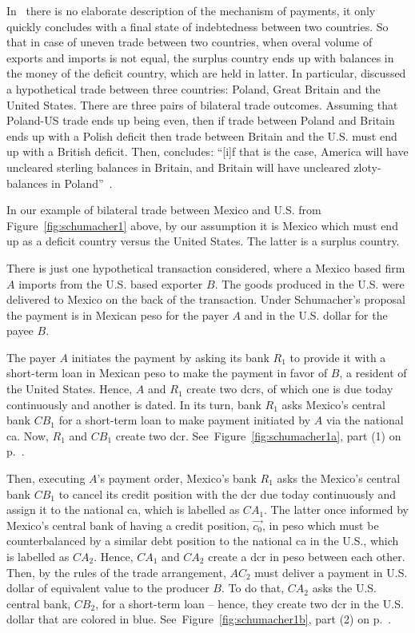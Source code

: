 In~\cite{schumacher1943} there is no elaborate description of the mechanism of payments, it only quickly concludes with a final state of indebtedness between two countries. So that in case of uneven trade between two countries, when overal volume of exports and imports is not equal, the surplus country ends up with balances in the money of the deficit country, which are held in latter. In particular, \citeauthor{schumacher1943} discussed a hypothetical trade between three countries: Poland, Great Britain and the United States. There are three pairs of bilateral trade outcomes. Assuming that Poland-US trade ends up being even, then if trade between Poland and Britain ends up with a Polish deficit then trade between Britain and the U.S. must end up with a British deficit. Then, \citeauthor{schumacher1943} concludes: ``[i]f that is the case, America will have uncleared sterling balances in Britain, and Britain will have uncleared zloty-balances in Poland''~\citep[pp.150-151]{schumacher1943}.

In our example of bilateral trade between Mexico and U.S. from Figure~\ref{fig:schumacher1} above, by our assumption it is Mexico which must end up as a deficit country versus the United States. The latter is a surplus country. 

There is just one hypothetical transaction considered, where a Mexico based firm $A$ imports from the U.S. based exporter $B$. The goods produced in the U.S. were delivered to Mexico on the back of the transaction. Under Schumacher's proposal the payment is in Mexican peso for the payer $A$ and in the U.S. dollar for the payee $B$. 

The payer $A$ initiates the payment by asking its bank $R_1$ to provide it with a short-term loan in Mexican peso to make the payment in favor of $B$, a resident of the United States. Hence, $A$ and $R_1$ create two \acfp{dcr}, of which one is due today continuously and another is dated. In its turn, bank $R_1$ asks Mexico's central bank $CB_1$ for a short-term loan to make payment initiated by $A$ via the national \acf{ca}. Now, $R_1$ and $CB_1$ create two \ac{dcr}. See~Figure~\ref{fig:schumacher1a}, part (1) on p.~\pageref{fig:schumacher1a}. 

Then, executing $A$'s payment order, Mexico's bank $R_1$ asks the Mexico's central bank $CB_1$ to cancel its credit position with the \ac{dcr} due today continuously and assign it to the national \ac{ca}, which is labelled as $CA_1$. The latter once informed by Mexico's central bank of having a credit position, $\overrightarrow{c_0}$, in peso which must be counterbalanced by a similar debt position to the national \ac{ca} in the U.S., which is labelled as $CA_2$. Hence, $CA_1$ and $CA_2$ create a \acf{dcr} in peso between each other. Then, by the rules of the trade arrangement, $AC_2$ must deliver a payment in U.S. dollar of equivalent value to the producer $B$. To do that, $CA_2$ asks the U.S. central bank, $CB_2$, for a short-term loan -- hence, they create two \ac{dcr} in the U.S. dollar that are colored in blue.  See~Figure~\ref{fig:schumacher1b}, part (2) on p.~\pageref{fig:schumacher1b}. 

